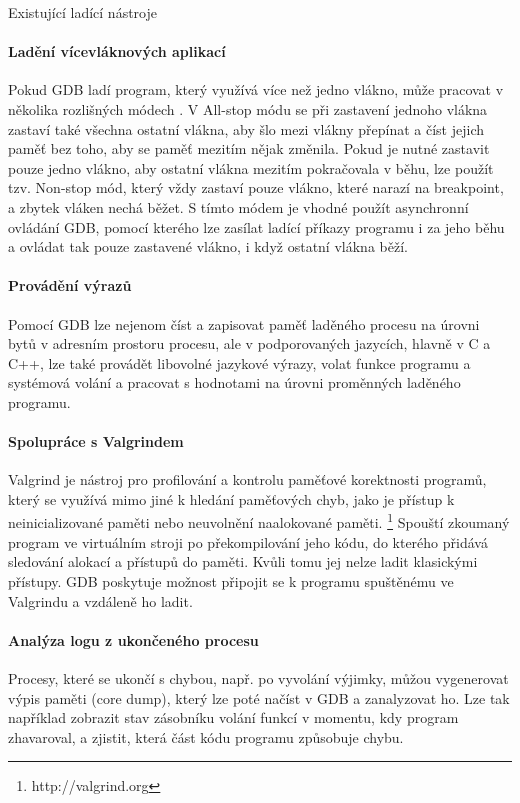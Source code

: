 \documentclass[czech,bachelor,male,python,dept460,hidelinks]{diploma}						%
\begin{document}
\begin{section}{Existující ladící nástroje}
		\paragraph*{Ladění vícevláknových aplikací}
			Pokud GDB ladí program, který využívá více než jedno vlákno, může pracovat v několika rozlišných módech \cite{gdb-multithreading}.
			V All-stop módu se při zastavení jednoho vlákna zastaví také všechna ostatní vlákna, aby šlo mezi vlákny přepínat a číst jejich paměť bez toho,
			aby se paměť mezitím nějak změnila. Pokud je nutné zastavit pouze jedno vlákno, aby ostatní vlákna mezitím pokračovala v běhu, lze použít tzv. Non-stop mód,
			který vždy zastaví pouze vlákno, které narazí na breakpoint, a zbytek vláken nechá běžet. S tímto módem je vhodné použít asynchronní ovládání GDB,
			pomocí kterého lze zasílat ladící příkazy programu i za jeho běhu a ovládat tak pouze zastavené vlákno, i když ostatní vlákna běží.
		\paragraph*{Provádění výrazů}
			Pomocí GDB lze nejenom číst a zapisovat paměť laděného procesu na úrovni bytů v adresním prostoru procesu, ale v podporovaných jazycích, hlavně
			v C a C++, lze také provádět libovolné jazykové výrazy, volat funkce programu a systémová volání a pracovat s hodnotami na úrovni proměnných
			laděného programu.
		\paragraph*{Spolupráce s Valgrindem}
			Valgrind je nástroj pro profilování a kontrolu paměťové korektnosti programů, který se využívá mimo jiné k hledání paměťových chyb, jako je přístup k
			neinicializované paměti nebo neuvolnění naalokované paměti. \footnote{http://valgrind.org}
			Spouští zkoumaný program ve virtuálním stroji po překompilování jeho kódu, do kterého přidává sledování alokací a přístupů do paměti.
			Kvůli tomu jej nelze ladit klasickými přístupy. GDB poskytuje možnost připojit se k programu spuštěnému ve Valgrindu a vzdáleně ho ladit.
		\paragraph*{Analýza logu z ukončeného procesu}
			Procesy, které se ukončí s chybou, např. po vyvolání výjimky, můžou vygenerovat výpis paměti (core dump), který lze poté načíst v GDB a zanalyzovat ho.
			Lze tak například zobrazit stav zásobníku volání funkcí v momentu, kdy program zhavaroval, a zjistit, která část kódu programu způsobuje chybu.

\end{section}
\end{document}
